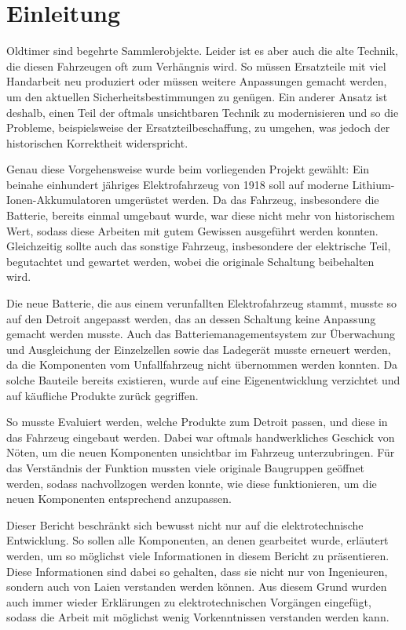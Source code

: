 \chapter{Einleitung}

Oldtimer sind begehrte Sammlerobjekte. Leider ist es aber auch die alte Technik, die diesen Fahrzeugen oft zum Verhängnis wird. So müssen Ersatzteile mit viel Handarbeit neu produziert oder müssen weitere Anpassungen gemacht werden, um den aktuellen Sicherheitsbestimmungen zu genügen. Ein anderer Ansatz ist deshalb, einen Teil der oftmals unsichtbaren Technik zu modernisieren und so die Probleme, beispielsweise der Ersatzteilbeschaffung, zu umgehen, was jedoch der historischen Korrektheit widerspricht.

Genau diese Vorgehensweise wurde beim vorliegenden Projekt gewählt: Ein beinahe einhundert jähriges Elektrofahrzeug von 1918 soll auf moderne Lithium-Ionen-Akkumulatoren umgerüstet werden. Da das Fahrzeug, insbesondere die Batterie, bereits einmal umgebaut wurde, war diese nicht mehr von historischem Wert, sodass diese Arbeiten mit gutem Gewissen ausgeführt werden konnten. Gleichzeitig sollte auch das sonstige Fahrzeug, insbesondere der elektrische Teil, begutachtet und gewartet werden, wobei die originale Schaltung beibehalten wird.

Die neue Batterie, die aus einem verunfallten Elektrofahrzeug stammt, musste so auf den Detroit angepasst werden, das an dessen Schaltung keine Anpassung gemacht werden musste. Auch das Batteriemanagementsystem zur Überwachung und Ausgleichung der Einzelzellen sowie das Ladegerät musste erneuert werden, da die Komponenten vom Unfallfahrzeug nicht übernommen werden konnten. Da solche Bauteile bereits existieren, wurde auf eine Eigenentwicklung verzichtet und auf käufliche Produkte zurück gegriffen.

So musste Evaluiert werden, welche Produkte zum Detroit passen, und diese in das Fahrzeug eingebaut werden. Dabei war oftmals handwerkliches Geschick von Nöten, um die neuen Komponenten unsichtbar im Fahrzeug unterzubringen. Für das Verständnis der Funktion mussten viele originale Baugruppen geöffnet werden, sodass nachvollzogen werden konnte, wie diese funktionieren, um die neuen Komponenten entsprechend anzupassen.

Dieser Bericht beschränkt sich bewusst nicht nur auf die elektrotechnische Entwicklung. So sollen alle Komponenten, an denen gearbeitet wurde, erläutert werden, um so möglichst viele Informationen in diesem Bericht zu präsentieren. Diese Informationen sind dabei so gehalten, dass sie nicht nur von Ingenieuren, sondern auch von Laien verstanden werden können. Aus diesem Grund wurden auch immer wieder Erklärungen zu elektrotechnischen Vorgängen eingefügt, sodass die Arbeit mit möglichst wenig Vorkenntnissen verstanden werden kann.